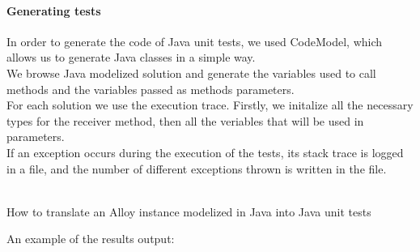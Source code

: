\paragraph{Generating tests}
In order to generate the code of Java unit tests, we used CodeModel, which allows us to generate Java classes in a simple way.\\
We browse Java modelized solution and generate the variables used to call methods and the variables passed as methods parameters.\\
For each solution we use the execution trace.
Firstly, we initalize all the necessary types for the receiver method, then all the veriables that will be used in parameters. \\
If an exception occurs during the execution of the tests, its stack trace is logged in a file, and the number of different exceptions thrown is written in the file.\\

\begin{algorithm}[H]
\SetAlgoLined
{}
~\\
\caption{How to translate an Alloy instance modelized in Java into Java unit tests}
\end{algorithm}
\bigskip
\bigskip
An example of the results output:


